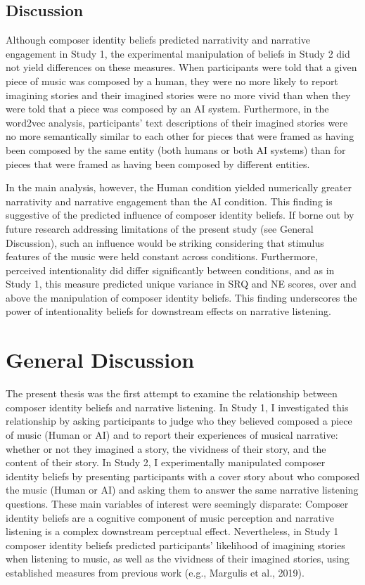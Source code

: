 \documentclass[12pt,twoside]{reedthesis}
\begin{document}
\section*{Discussion}

Although composer identity beliefs predicted narrativity and narrative engagement in Study 1, the experimental manipulation of beliefs in Study 2 did not yield differences on these measures. When participants were told that a given piece of music was composed by a human, they were no more likely to report imagining stories and their imagined stories were no more vivid than when they were told that a piece was composed by an AI system. Furthermore, in the word2vec analysis, participants’ text descriptions of their imagined stories were no more semantically similar to each other for pieces that were framed as having been composed by the same entity (both humans or both AI systems) than for pieces that were framed as having been composed by different entities. 

In the main analysis, however, the Human condition yielded numerically greater narrativity and narrative engagement than the AI condition. This finding is suggestive of the predicted influence of composer identity beliefs. If borne out by future research addressing limitations of the present study (see General Discussion), such an influence would be striking considering that stimulus features of the music were held constant across conditions. Furthermore, perceived intentionality did differ significantly between conditions, and as in Study 1, this measure predicted unique variance in SRQ and NE scores, over and above the manipulation of composer identity beliefs. This finding underscores the power of intentionality beliefs for downstream effects on narrative listening. 

\chapter*{General Discussion}
The present thesis was the first attempt to examine the relationship between composer identity beliefs and narrative listening. In Study 1, I investigated this relationship by asking participants to judge who they believed composed a piece of music (Human or AI) and to report their experiences of musical narrative: whether or not they imagined a story, the vividness of their story, and the content of their story. In Study 2, I experimentally manipulated composer identity beliefs by presenting participants with a cover story about who composed the music (Human or AI) and asking them to answer the same narrative listening questions. These main variables of interest were seemingly disparate: Composer identity beliefs are a cognitive component of music perception and narrative listening is a complex downstream perceptual effect. Nevertheless, in Study 1 composer identity beliefs predicted participants’ likelihood of imagining stories when listening to music, as well as the vividness of their imagined stories, using established measures from previous work (e.g., Margulis et al., 2019). 
\end{document}
